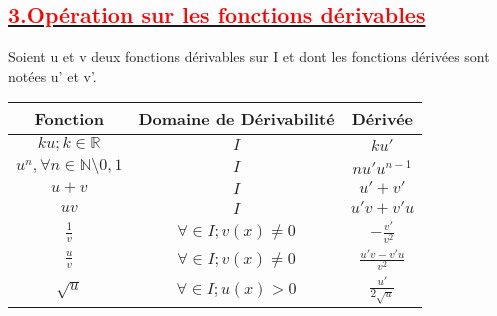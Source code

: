 \documentclass[12pt]{article}
\begin{document}
\subsection*{\underline{\textbf{\textcolor{red}{3.Opération sur les fonctions dérivables}}}}
Soient u et v deux fonctions dérivables sur I et dont les fonctions dérivées sont notées u' et v'.
\begin{center}
\begin{tabular}{|c|c|c|}
\hline
Fonction &Domaine de Dérivabilité &  Dérivée   \\
\hline
$ku;k\in \mathbb{R}$& $I$ & $ku'$ \\
\hline
$u^{n}, \forall n \in \mathbb{N}\setminus{0,1}$ & $I$ &$nu'u^{n-1}$\\
\hline
$u+v$& $I$ & $u'+v'$ \\
\hline
$uv$& $I$ & $u'v+v'u$ \\
\hline
$\frac{1}{v}$& $\forall \in I; v(x) \neq 0$ & $-\frac{v'}{v^{2}}$ \\
\hline
$\frac{u}{v}$& $\forall \in I; v(x) \neq 0$ & $\frac{u'v-v'u}{v^{2}}$ \\
\hline
$\sqrt{u}$& $\forall \in I; u(x) > 0$ & $\frac{u'}{2\sqrt{u}}$ \\
\hline
\end{tabular}
\end{center}
\end{document}

